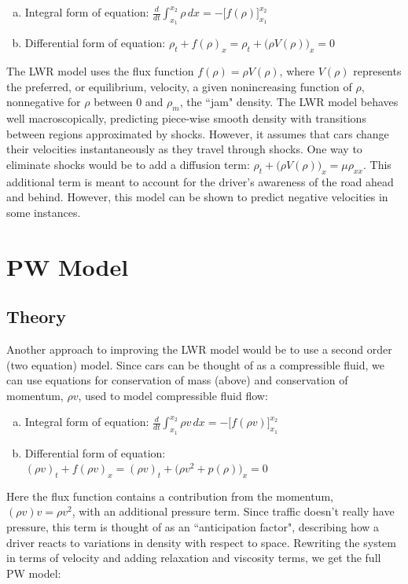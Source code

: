 \documentclass{article}
\begin{document}
\begin{enumerate}[(a)]
\item Integral form of equation: $\displaystyle \frac{d}{dt} \int_{x_1}^{x_2} \rho \, dx = -\Big[ f( \rho ) \Big]_{x_1}^{x_2}$
\item Differential form of equation: $\rho_t + f( \rho )_x = \rho_t + \Big( \rho V(\rho) \Big)_x = 0$
\end{enumerate}

The LWR model uses the flux function $f(\rho) = \rho V(\rho)$, where $V(\rho)$ represents the preferred, or equilibrium, velocity, a given nonincreasing function of $\rho$, nonnegative for $\rho$ between 0 and $\rho_m$, the ``jam" density.  The LWR model behaves well macroscopically, predicting piece-wise smooth density with transitions between regions approximated by shocks.  However, it assumes that cars change their velocities instantaneously as they travel through shocks.  One way to eliminate shocks would be to add a diffusion term: $\rho_t + \Big(\rho V(\rho)\Big)_x = \mu \rho_{xx}$.  This additional term is meant to account for the driver's awareness of the road ahead and behind.  However, this model can be shown to predict negative velocities in some instances.  

\section{PW Model}

\subsection{Theory}
Another approach to improving the LWR model would be to use a second order (two equation) model.  Since cars can be thought of as a compressible fluid, we can use equations for conservation of mass (above) and conservation of momentum, $\rho v$, used to model compressible fluid flow:

\begin{enumerate}[(a)]
\item Integral form of equation: $\displaystyle \frac{d}{dt} \int_{x_1}^{x_2} \rho v \, dx = -\Big[ f( \rho v ) \Big]_{x_1}^{x_2}$
\item Differential form of equation: $(\rho v)_t + f( \rho v )_x = (\rho v)_t + \Big( \rho v^2 + p(\rho) \Big)_x = 0$
\end{enumerate}

Here the flux function contains a contribution from the momentum, $(\rho v)v = \rho v^2$, with an additional pressure term.  Since traffic doesn't really have pressure, this term is thought of as an ``anticipation factor", describing how a driver reacts to variations in density with respect to space. Rewriting the system in terms of velocity and adding relaxation and viscosity terms, we get the full PW model:
\end{document}
